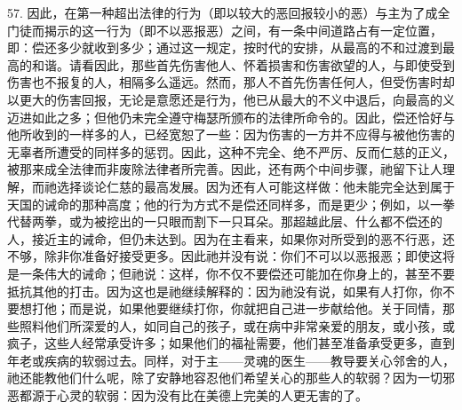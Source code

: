 57. 因此，在第一种超出法律的行为（即以较大的恶回报较小的恶）与主为了成全门徒而揭示的这一行为（即不以恶报恶）之间，有一条中间道路占有一定位置，即：偿还多少就收到多少；通过这一规定，按时代的安排，从最高的不和过渡到最高的和谐。请看因此，那些首先伤害他人、怀着损害和伤害欲望的人，与即使受到伤害也不报复的人，相隔多么遥远。然而，那人不首先伤害任何人，但受伤害时却以更大的伤害回报，无论是意愿还是行为，他已从最大的不义中退后，向最高的义迈进如此之多；但他仍未完全遵守梅瑟所颁布的法律所命令的。因此，偿还恰好与他所收到的一样多的人，已经宽恕了一些：因为伤害的一方并不应得与被他伤害的无辜者所遭受的同样多的惩罚。因此，这种不完全、绝不严厉、反而仁慈的正义，被那来成全法律而非废除法律者所完善。因此，还有两个中间步骤，祂留下让人理解，而祂选择谈论仁慈的最高发展。因为还有人可能这样做：他未能完全达到属于天国的诫命的那种高度；他的行为方式不是偿还同样多，而是更少；例如，以一拳代替两拳，或为被挖出的一只眼而割下一只耳朵。那超越此层、什么都不偿还的人，接近主的诫命，但仍未达到。因为在主看来，如果你对所受到的恶不行恶，还不够，除非你准备好接受更多。因此祂并没有说：你们不可以以恶报恶；即使这将是一条伟大的诫命；但祂说：这样，你不仅不要偿还可能加在你身上的，甚至不要抵抗其他的打击。因为这也是祂继续解释的：因为祂没有说，如果有人打你，你不要想打他；而是说，如果他要继续打你，你就把自己进一步献给他。关于同情，那些照料他们所深爱的人，如同自己的孩子，或在病中非常亲爱的朋友，或小孩，或疯子，这些人经常承受许多；如果他们的福祉需要，他们甚至准备承受更多，直到年老或疾病的软弱过去。同样，对于主——灵魂的医生——教导要关心邻舍的人，祂还能教他们什么呢，除了安静地容忍他们希望关心的那些人的软弱？因为一切邪恶都源于心灵的软弱：因为没有比在美德上完美的人更无害的了。\par

